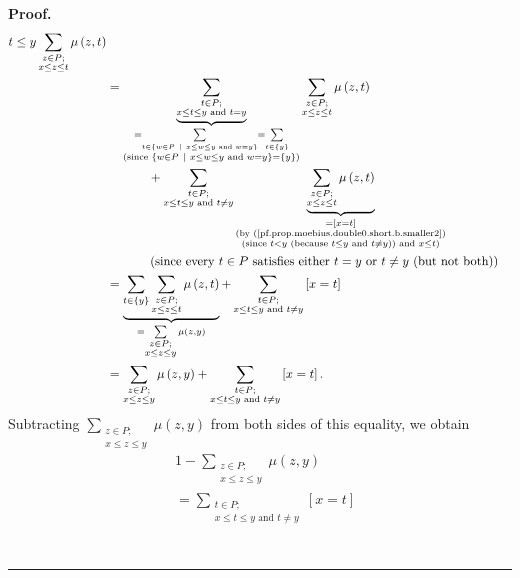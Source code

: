 \documentclass[numbers=enddot,12pt,final,onecolumn,notitlepage]{scrartcl}%
\theoremstyle{definition}
\newenvironment{proof}[1][Proof]{\noindent\textbf{#1.} }{\ \rule{0.5em}{0.5em}}
\newenvironment{vershort}{}{}
\let\sumnonlimits\sum
\renewcommand{\sum}{\sumnonlimits\limits}
\begin{document}
\begin{vershort}
\begin{proof}
\begin{align*}
{{t\leq y}}\sum_{\substack{z\in P;\\x\leq z\leq t}}\mu\left(  z,t\right) \\
&  =\underbrace{\sum_{\substack{t\in P;\\x\leq t\leq y\text{ and }t=y}%
}}_{\substack{=\sum_{t\in\left\{  w\in P\ \mid\ x\leq w\leq y\text{ and
}w=y\right\}  }=\sum_{t\in\left\{  y\right\}  }\\\text{(since }\left\{  w\in
P\ \mid\ x\leq w\leq y\text{ and }w=y\right\}  =\left\{  y\right\}  \text{)}%
}}\sum_{\substack{z\in P;\\x\leq z\leq t}}\mu\left(  z,t\right) \\
&  \ \ \ \ \ \ \ \ \ \ +\sum_{\substack{t\in P;\\x\leq t\leq y\text{ and
}t\neq y}}\underbrace{\sum_{\substack{z\in P;\\x\leq z\leq t}}\mu\left(
z,t\right)  }_{\substack{=\left[  x=t\right]  \\\text{(by
(\ref{pf.prop.moebius.double0.short.b.smaller2})}\\\text{(since }t<y\text{
(because }t\leq y\text{ and }t\neq y\text{)) and }x\leq t\text{)}}}\\
&  \ \ \ \ \ \ \ \ \ \ \left(  \text{since every }t\in P\text{ satisfies
either }t=y\text{ or }t\neq y\text{ (but not both)}\right) \\
&  =\underbrace{\sum_{t\in\left\{  y\right\}  }\sum_{\substack{z\in P;\\x\leq
z\leq t}}\mu\left(  z,t\right)  }_{=\sum_{\substack{z\in P;\\x\leq z\leq
y}}\mu\left(  z,y\right)  }+\sum_{\substack{t\in P;\\x\leq t\leq y\text{ and
}t\neq y}}\left[  x=t\right] \\
&  =\sum_{\substack{z\in P;\\x\leq z\leq y}}\mu\left(  z,y\right)
+\sum_{\substack{t\in P;\\x\leq t\leq y\text{ and }t\neq y}}\left[
x=t\right]  .
\end{align*}
Subtracting $\sum_{\substack{z\in P;\\x\leq z\leq y}}\mu\left(  z,y\right)  $
from both sides of this equality, we obtain%
\begin{align*}
&  1-\sum_{\substack{z\in P;\\x\leq z\leq y}}\mu\left(  z,y\right) \\
&  =\sum_{\substack{t\in P;\\x\leq t\leq y\text{ and }t\neq y}}\left[
x=t\right] \\

\end{align*}
\end{proof}
\end{vershort}
\end{document}
